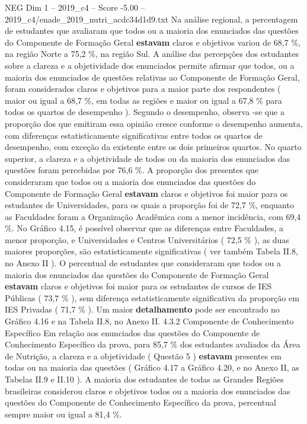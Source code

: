 \begin{textsample}{NEG Dim 1 – 2019\_c4 – Score -5.00 – 2019\_c4/enade\_2019\_nutri\_acdc34d1d9.txt}
Na análise regional, a percentagem de estudantes que avaliaram que todos ou a maioria dos enunciados das questões do Componente de Formação Geral \textbf{estavam} claros e objetivos variou de 68,7 \%, na região Norte a 75,2 \%, na região Sul.
A análise das percepções dos estudantes sobre a clareza e a objetividade dos enunciados permite afirmar que todos, ou a maioria dos enunciados de questões relativas ao Componente de Formação Geral, foram considerados claros e objetivos para a maior parte dos respondentes ( maior ou igual a 68,7 \%, em todas as regiões e maior ou igual a 67,8 \% para todos os quartos de desempenho ).
Segundo o desempenho, observa -se que a proporção dos que emitiram essa opinião cresce conforme o desempenho aumenta, com diferenças estatisticamente significativas entre todos os quartos de desempenho, com exceção da existente entre os dois primeiros quartos.
No quarto superior, a clareza e a objetividade de todos ou da maioria dos enunciados das questões foram percebidas por 76,6 \%.
A proporção dos presentes que consideraram que todos ou a maioria dos enunciados das questões do Componente de Formação Geral \textbf{estavam} claros e objetivos foi maior para os estudantes de Universidades, para os quais a proporção foi de 72,7 \%, enquanto as Faculdades foram a Organização Acadêmica com a menor incidência, com 69,4 \%.
No Gráfico 4.15, é possível observar que as diferenças entre Faculdades, a menor proporção, e Universidades e Centros Universitários ( 72,5 \% ), as duas maiores proporções, são estatisticamente significativas ( ver também Tabela II.8, no Anexo II ).
O percentual de estudantes que consideraram que todos ou a maioria dos enunciados das questões do Componente de Formação Geral \textbf{estavam} claros e objetivos foi maior para os estudantes de cursos de IES Públicas ( 73,7 \% ), sem diferença estatisticamente significativa da proporção em IES Privadas ( 71,7 \% ).
Um maior \textbf{detalhamento} pode ser encontrado no Gráfico 4.16 e na Tabela II.8, no Anexo II. 4.3.2 Componente de Conhecimento Específico Em relação aos enunciados das questões do Componente de Conhecimento Específico da prova, para 85,7 \% dos estudantes avaliados da Área de Nutrição, a clareza e a objetividade ( Questão 5 ) \textbf{estavam} presentes em todas ou na maioria das questões ( Gráfico 4.17 a Gráfico 4.20, e no Anexo II, as Tabelas II.9 e II.10 ).
A maioria dos estudantes de todas as Grandes Regiões brasileiras considerou claros e objetivos todos ou a maioria dos enunciados das questões do Componente de Conhecimento Específico da prova, percentual sempre maior ou igual a 81,4 \%.

\end{textsample}
